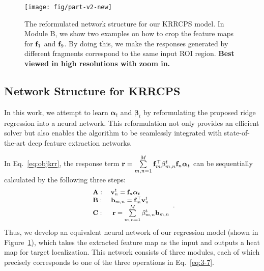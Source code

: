 \documentclass[10pt,twocolumn,letterpaper]{article}
\begin{document}
\begin{figure}[t]
\centering
\texttt{[image: fig/part-v2-new]}\\
\caption{The reformulated network structure for our KRRCPS model. In Module B, we show
two examples on how to crop the feature maps for ${\bf f}_1$ and ${\bf f}_9$.
By doing this, we make the responses generated by different fragments correspond to the same
 input ROI region.
  \textbf{Best viewed in high resolutions with
  zoom in.}}
  \label{fig:3-1}
  \vspace{-2mm}
\end{figure}




\subsection{Network Structure for KRRCPS}
In this work, we attempt to learn ${\bm \alpha}_t$ and ${\bm \beta}_t$ by reformulating
the proposed ridge regression into a neural network. This reformulation not only provides
an efficient solver but also enables the algorithm to be seamlessly integrated with
state-of-the-art deep feature extraction networks.

In Eq.~\ref{eq:objkrr}, the response term ${\bf r}=\sum\limits_{m ,n = 1}^M {{\bf{f}}_m^
\top{\beta _{m,n}^t}{{\bf{f}}_n}} {\bm{\alpha }}_t$ can be sequentially calculated by the
following three steps:
\begin{equation}
\begin{small}
\begin{array}{l}
{\mathbf{A:}}{\kern 12.0pt}{{\bf{v}}_n^t} = {{\bf{f}}_n}{\bm{\alpha }}_t\\
{\mathbf{B:}}{\kern 13.0pt}{{\bf{b}}_{m,n}} = {\bf{f}}_m^\top{{\bf{v}}_n^t}\\
{\mathbf{C:}}{\kern 15.0pt}{\bf r} = \sum\limits_{m, n = 1}^M {{\beta _{m,n}^t}}
{{\bf{b}}_{m,n}}
\end{array}.
\label{eq:3-7}
\end{small}
\end{equation}
Thus, we develop an equivalent neural network of our regression model (shown in
Figure~\ref{fig:3-1}), which takes the extracted feature map as the input and
outputs a heat map for target localization. This network consists of three modules,
each of which precisely corresponds to one of the three operations in Eq.~\ref{eq:3-7}.
\end{document}

